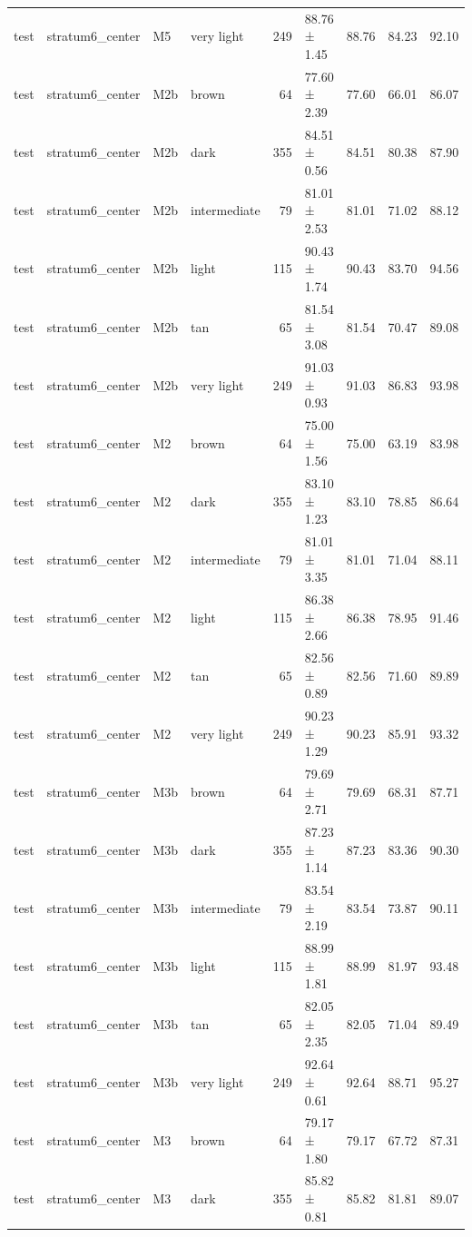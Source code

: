 \begin{tabular}{llllrlrrr}
test & stratum6\_center & M5 & very light & 249 & 88.76 ± 1.45 & 88.76 & 84.23 & 92.10 \\
test & stratum6\_center & M2b & brown & 64 & 77.60 ± 2.39 & 77.60 & 66.01 & 86.07 \\
test & stratum6\_center & M2b & dark & 355 & 84.51 ± 0.56 & 84.51 & 80.38 & 87.90 \\
test & stratum6\_center & M2b & intermediate & 79 & 81.01 ± 2.53 & 81.01 & 71.02 & 88.12 \\
test & stratum6\_center & M2b & light & 115 & 90.43 ± 1.74 & 90.43 & 83.70 & 94.56 \\
test & stratum6\_center & M2b & tan & 65 & 81.54 ± 3.08 & 81.54 & 70.47 & 89.08 \\
test & stratum6\_center & M2b & very light & 249 & 91.03 ± 0.93 & 91.03 & 86.83 & 93.98 \\
test & stratum6\_center & M2 & brown & 64 & 75.00 ± 1.56 & 75.00 & 63.19 & 83.98 \\
test & stratum6\_center & M2 & dark & 355 & 83.10 ± 1.23 & 83.10 & 78.85 & 86.64 \\
test & stratum6\_center & M2 & intermediate & 79 & 81.01 ± 3.35 & 81.01 & 71.04 & 88.11 \\
test & stratum6\_center & M2 & light & 115 & 86.38 ± 2.66 & 86.38 & 78.95 & 91.46 \\
test & stratum6\_center & M2 & tan & 65 & 82.56 ± 0.89 & 82.56 & 71.60 & 89.89 \\
test & stratum6\_center & M2 & very light & 249 & 90.23 ± 1.29 & 90.23 & 85.91 & 93.32 \\
test & stratum6\_center & M3b & brown & 64 & 79.69 ± 2.71 & 79.69 & 68.31 & 87.71 \\
test & stratum6\_center & M3b & dark & 355 & 87.23 ± 1.14 & 87.23 & 83.36 & 90.30 \\
test & stratum6\_center & M3b & intermediate & 79 & 83.54 ± 2.19 & 83.54 & 73.87 & 90.11 \\
test & stratum6\_center & M3b & light & 115 & 88.99 ± 1.81 & 88.99 & 81.97 & 93.48 \\
test & stratum6\_center & M3b & tan & 65 & 82.05 ± 2.35 & 82.05 & 71.04 & 89.49 \\
test & stratum6\_center & M3b & very light & 249 & 92.64 ± 0.61 & 92.64 & 88.71 & 95.27 \\
test & stratum6\_center & M3 & brown & 64 & 79.17 ± 1.80 & 79.17 & 67.72 & 87.31 \\
test & stratum6\_center & M3 & dark & 355 & 85.82 ± 0.81 & 85.82 & 81.81 & 89.07 \\

\end{tabular}
